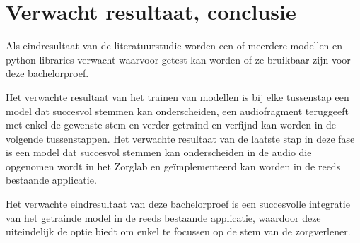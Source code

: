 \section{Verwacht resultaat, conclusie}%
\label{sec:verwachte_resultaten}

Als eindresultaat van de literatuurstudie worden een of meerdere modellen en python libraries verwacht waarvoor getest kan worden of ze bruikbaar zijn voor deze bachelorproef.

Het verwachte resultaat van het trainen van modellen is bij elke tussenstap een model dat succesvol stemmen kan onderscheiden, een audiofragment teruggeeft met enkel de gewenste stem en verder getraind en verfijnd kan worden in de volgende tussenstappen. Het verwachte resultaat van de laatste stap in deze fase is een model dat succesvol stemmen kan onderscheiden in de audio die opgenomen wordt in het Zorglab en geïmplementeerd kan worden in de reeds bestaande applicatie.

Het verwachte eindresultaat van deze bachelorproef is een succesvolle integratie van het getrainde model in de reeds bestaande applicatie, waardoor deze uiteindelijk de optie biedt om enkel te focussen op de stem van de zorgverlener.
